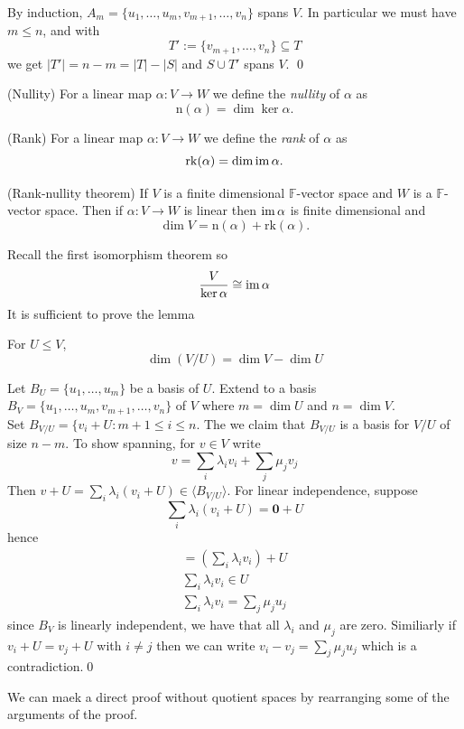 \documentclass{article}
\newcommand{\F}{\mathbb{F}}
\newcommand{\n}{\mathrm{n}}
\newcommand{\rk}{\mathrm{rk}}
\begin{document}
By induction, $ A_m=\{u_1,\dots,u_m,v_{m+1},\dots,v_n\} $ spans $ V $. In particular we must have $ m\le n $, and with
\[
	T':=\{v_{m+1},\dots,v_n\}\subseteq T
\]
we get $ |T'|=n-m=|T|-|S| $ and $ S\cup T' $ spans $ V $. \qed
\begin{definition}
	(Nullity) For a linear map $ \alpha:V\to W $ we define the \textit{nullity} of $ \alpha $ as
	\[
	  \n(\alpha)=\dim\ker\alpha.
	\]
\end{definition}
\begin{definition}
	(Rank) For a linear map $ \alpha:V\to W $ we define the \textit{rank} of $ \alpha $ as
	\[
	  \rk(\alpha)=\dim\ima\alpha.
	\]
\end{definition}
\begin{theorem}
	(Rank-nullity theorem) If $ V $ is a finite dimensional $ \F $-vector space and $ W  $ is a $ \F $-vector space. Then if $ \alpha:V\to W $ is linear then $ \operatorname{im} \alpha $ is finite dimensional and
	\[
	  \dim V=\n(\alpha)+\rk(\alpha).
	\]
\end{theorem}
\pf Recall the first isomorphism theorem so
\[
	\frac V{\ker \alpha}\cong \operatorname{im}\alpha
\]
It is sufficient to prove the lemma
\begin{lemma}
  For $ U\le V $,
  \[
    \dim(V/U)=\dim V-\dim U
  \]
\end{lemma}
\pf Let $ B_U=\{u_1,\dots, u_m\} $ be a basis of $ U $. Extend to a basis $ B_V=\{u_1,\dots, u_m,v_{m+1},\dots, v_n\} $ of $ V $ where $ m=\dim U $ and $ n=\dim V $.\\
Set $ B_{V/U}=\{v_i+U:m+1\le i\le n $. The we claim that $ B_{V/U} $ is a basis for $ V/U $ of size $ n-m $. To show spanning, for $ v\in V $ write
	\[
	  v=\sum_i\lambda_iv_i+\sum_j\mu_jv_j
	\]
	Then $ v+U=\sum_i\lambda_i(v_i+U)\in \langle B_{V/U}\rangle $. For linear independence, suppose
	\[
	  \sum_i\lambda_i(v_i+U)=\mathbf 0+U
  \]
	hence 
	\begin{align*}
	  =\left(\sum_i\lambda_iv_i\right)+U \\
	  \sum_i\lambda_iv_i\in U\\
	  \sum_i\lambda_iv_i=\sum_j\mu_ju_j
	\end{align*}
	since $ B_V $ is linearly independent, we have that all $ \lambda_i $ and $ \mu_j $ are zero. Similiarly if $ v_i+U=v_j+U $ with $ i\ne j $ then we can write $ v_i-v_j=\sum_j\mu_ju_j $ which is a contradiction.\qed
	\begin{remark}
	   We can maek a direct proof without quotient spaces by rearranging some of the arguments of the proof.
	\end{remark}
\end{document}
